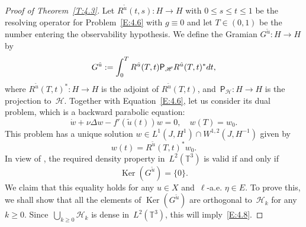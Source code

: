 \documentclass[11pt]{article}
\theoremstyle{plain}
\theoremstyle{definition}
\let\mathcal\mathscr
\theoremstyle{plain}
\numberwithin{equation}{section}
\newcommand{\dd}{{\textup d}}
\newcommand{\T}{{\mathbb T}}
\DeclareMathOperator{\Ker}{Ker}
\newcommand{\HH}{{\mathcal H}}
\begin{document}
\begin{proof}[Proof of Theorem~\ref{T:4.3}]
Let $R^{\tilde u}(t,s):H\to H$ with $0\le s\le t\le 1$ be the resolving operator for Problem~\eqref{E:4.6} with $g\equiv0$ and let $T\in(0,1)$ be the number entering the observability hypothesis. We define the Gramian $G^{\tilde u}:H\to H$ by\vspace*{-3pt}
\begin{equation} \label{E:4.7}
G^{\tilde u}:=\int_0^T R^{\tilde u}(T,t){\mathsf P}_\HH R^{\tilde u}(T,t)^*\dd t,
\end{equation}
where $R^{\tilde u}(T,t)^*:H\to H$ is the adjoint of $R^{\tilde u}(T,t)$, and~${\mathsf P}_\HH: H\to H$ is the projection to~$\HH$. Together with Equation~\eqref{E:4.6}, let us consider its dual problem, which is a backward parabolic equation:\vspace*{-3pt}
\begin{equation} \label{E:4.9}
\dot w+\nu \Delta w-f'(\tilde u(t)) w=0, \quad w(T)=w_0.
\end{equation}
This problem has a unique solution $w\in L^1(J,H^1)\cap W^{1,2}(J,H^{-1})$ given by\vspace*{-3pt}
\begin{equation} \label{E:4.10}
w(t)=R^{\tilde u}(T,t)^*w_0.
\end{equation}
In view of \cite[Part\,IV, Th.\,2.5]{zabczyk2008}, the required density property in~$L^2(\T^3)$ is valid if and only if\vspace*{-3pt}
\begin{equation}\label{E:4.8}
\Ker(G^{\tilde u})=\{0\}.
\end{equation}
We claim that this equality holds for any $u\in X$ and~$\ell$-a.e. $\eta\in E$. To prove this, we shall show that all the elements of $ \Ker(G^{\tilde u})$ are orthogonal to~$\HH_k$ for any~$k\ge0$. Since~$\bigcup_{k\ge0}\HH_k$ is dense in~$L^2(\T^3)$, this will imply~\eqref{E:4.8}.


\end{proof}
\end{document}
